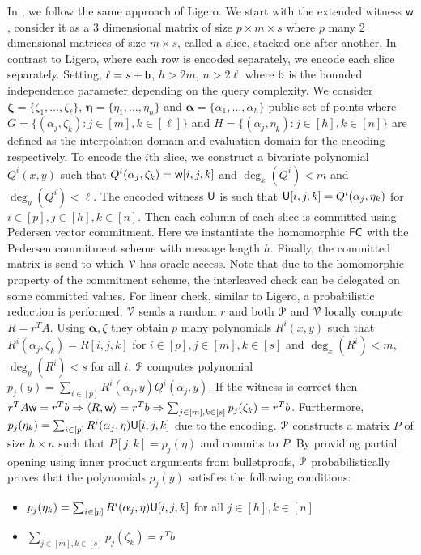 In \name, we follow the same approach of Ligero. We start with the extended witness $\mathsf{w}$, consider it as a 3 dimensional matrix of size $p \times m \times s$ where $p$ many 2 dimensional matrices of size $m \times s$, called a slice, stacked one after another. In contrast to Ligero, where each row is encoded separately, we encode each slice separately. 
Setting, $\ell = s + \mathsf{b}$, $h > 2m$, $n > 2\ell$ where $\mathsf{b}$ is the bounded independence parameter depending on the query complexity. We consider ${\bm \zeta} = \{ \zeta_1, \ldots, \zeta_{\ell}\}$, ${\bm \eta} = \{\eta_1, \ldots, \eta_{n}\}$ and ${\bm \alpha} = \{ \alpha_1, \ldots, \alpha_h \}$ public set of points where $G = \{(\alpha_j,\zeta_k) : j \in [m],k \in [\ell] \}$ and $H = \{(\alpha_j,\eta_k) : j \in [h],k \in [n] \}$ are defined as the interpolation domain and evaluation domain for the encoding respectively. To encode the $i$th slice, we construct a bivariate polynomial $Q^i(x,y)$ such that $Q^i(\alpha_j,\zeta_k) = \mathsf{w}[i,j,k]$ and $\deg_x(Q^i) < m$ and $\deg_y(Q^i) < \ell$.
The encoded witness $\mathsf{U}$ is such that $\mathsf{U}[i,j,k] = Q^i(\alpha_j,\eta_k)$ for $i\in[p], j\in[h], k\in[n]$. Then each column of each slice is committed using Pedersen vector commitment. Here we instantiate the homomorphic $\mathsf{FC}$ with the Pedersen commitment scheme with message length $h$. Finally, the committed matrix is send to which $\mathcal{V}$ has oracle access. 
Note that due to the homomorphic property of the commitment scheme, the interleaved check can be delegated on some committed values. 
For linear check, similar to Ligero, a probabilistic reduction is performed. $\mathcal{V}$ sends a random $r$ and both $\mathcal{P}$ and $\mathcal{V}$ locally compute $R = r^TA$. Using ${\bm \alpha, \zeta}$ they obtain $p$ many polynomials $R^i(x,y)$ such that $R^i(\alpha_j, \zeta_k) = R[i,j,k]$ for $i\in[p], j\in[m], k\in[s]$ and $\deg_x(R^i) < m$, $\deg_y(R^i) < s$ for all $i$. $\mathcal{P}$ computes polynomial $p_j(y) = \sum_{i\in[p]} R^i(\alpha_j, y) Q^i(\alpha_j, y)$. If the witness is correct then $r^TA\mathsf{w} = r^Tb \Rightarrow \langle R,\mathsf{w}\rangle = r^T b \Rightarrow \sum_{j\in [m], k\in [s]} p_j (\zeta_k) = r^Tb$. Furthermore, $p_j(\eta_k) = \sum_{i\in[p]} R^i(\alpha_j, \eta) \mathsf{U}[i,j,k]$ due to the encoding. $\mathcal{P}$ constructs a matrix $P$ of size $h \times n$ such that $P[j,k] = p_j(\eta)$ and commits to $P$. By providing partial opening using inner product arguments from bulletproofs, $\mathcal{P}$ probabilistically proves that the polynomials $p_j(y)$ satisfies the following conditions:
\begin{itemize}
	\item $p_j(\eta_k) = \sum_{i\in[p]} R^i(\alpha_j, \eta) \mathsf{U}[i,j,k]$ for all $j \in [h], k \in [n]$
	\item $\sum_{j\in [m], k\in [s]} p_j (\zeta_k) = r^Tb$
\end{itemize}

